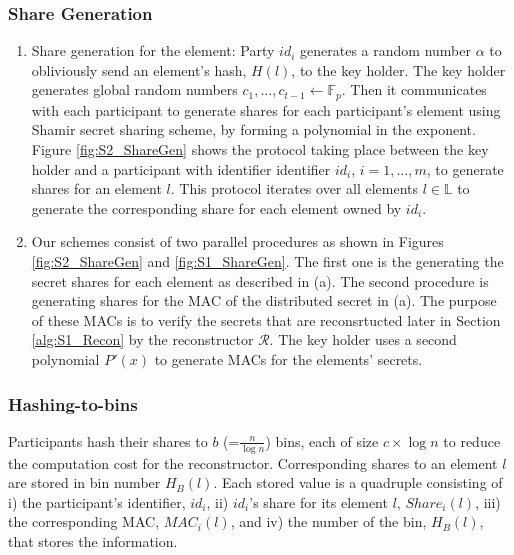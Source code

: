 \subsubsection{Share Generation}\label{ShareGen_S2}
\begin{enumerate}[label=(\alph*)]
    \item Share generation for the element: Party $id_i$ generates a random number $\alpha$ to obliviously send an element's hash, $H(l)$, to the key holder. The key holder generates global random numbers $c_1, \dots, c_{t-1} \gets \mathbb{F}_p$. Then it communicates with each participant to generate shares for each participant's element using Shamir secret sharing scheme, by forming a polynomial in the exponent. Figure \ref{fig:S2_ShareGen} shows the protocol taking place between the key holder and a participant with identifier identifier $id_i$, $i =1, \dots, m$, to generate shares for an element $l$. This protocol iterates over all elements $l \in \mathbb{L}$ to generate the corresponding share for each element owned by $id_i$.
    \item Our schemes consist of two parallel procedures as shown in Figures \ref{fig:S2_ShareGen} and \ref{fig:S1_ShareGen}. The first one is the generating the secret shares for each element as described in (a). The second procedure is generating shares for the MAC of the distributed secret in (a). The purpose of these MACs is to verify the secrets that are reconsrtucted later in Section \ref{alg:S1_Recon} by the reconstructor $\mathcal{R}$. The key holder uses a second polynomial $P'(x)$ to generate MACs for the elements' secrets. 
\end{enumerate}

\subsubsection{Hashing-to-bins}\label{Binning_S2} 
Participants hash their shares to $b$ (=$\frac{n}{\log{n}}$) bins, each of size $c\times \log{n}$ to reduce the computation cost for the reconstructor. Corresponding shares to an element $l$ are stored in bin number $H_B(l)$. Each stored value is a quadruple consisting of i) the participant's identifier, $id_i$, ii) $id_i$'s share for its element $l$, $Share_i(l)$, iii) the corresponding MAC, $MAC_i(l)$, and iv) the number of the bin, $H_B(l)$, that stores the information.

